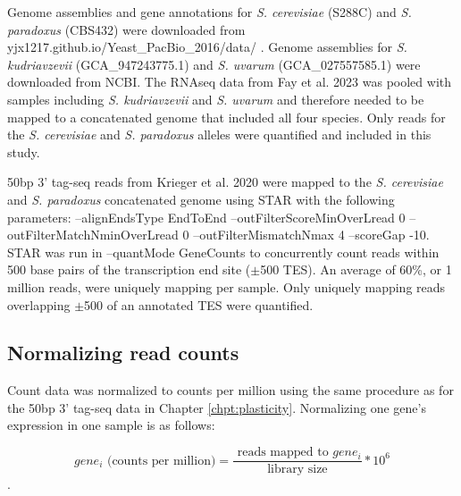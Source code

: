 Genome assemblies and gene annotations for \textit{S. cerevisiae} (S288C) and \textit{S. paradoxus} (CBS432) were downloaded from yjx1217.github.io/Yeast\_PacBio\_2016/data/ \cite{Yue2017}. Genome assemblies for \textit{S. kudriavzevii} (GCA\_947243775.1) and \textit{S. uvarum} (GCA\_027557585.1) were downloaded from NCBI. The RNAseq data from Fay et al. 2023 was pooled with samples including \textit{S. kudriavzevii} and \textit{S. uvarum} and therefore needed to be mapped to a concatenated genome that included all four species. Only reads for the \textit{S. cerevisiae} and \textit{S. paradoxus} alleles were quantified and included in this study.

50bp 3' tag-seq reads from Krieger et al. 2020 were mapped to the \textit{S. cerevisiae} and \textit{S. paradoxus} concatenated genome using STAR with the following parameters: --alignEndsType EndToEnd --outFilterScoreMinOverLread 0  --outFilterMatchNminOverLread 0 --outFilterMismatchNmax 4  --scoreGap -10. STAR was run in --quantMode GeneCounts to concurrently count reads within 500 base pairs of the transcription end site ($\pm$500 TES). An average of 60\%, or 1 million reads, were uniquely mapping per sample. Only uniquely mapping reads overlapping $\pm$500 of an annotated TES were quantified.

\subsection{Normalizing read counts}

Count data was normalized to counts per million using the same procedure as for the 50bp 3' tag-seq data in Chapter \ref{chpt:plasticity}. Normalizing one gene's expression in one sample is as follows:

$$ gene_i \text{ (counts per million)} = \frac{\text{ reads mapped to } gene_i}{\text{library size}}*10^6 $$.
